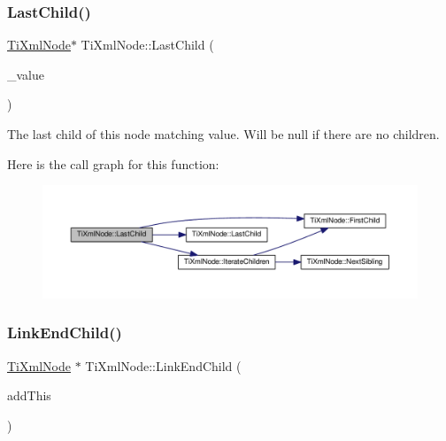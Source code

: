 \subsubsection{\texorpdfstring{Last\+Child()}{LastChild()}\hspace{0.1cm}{\footnotesize\ttfamily [4/4]}}
{\footnotesize\ttfamily \hyperlink{class_ti_xml_node}{Ti\+Xml\+Node}$\ast$ Ti\+Xml\+Node\+::\+Last\+Child (\begin{DoxyParamCaption}\item[{const char $\ast$}]{\+\_\+value }\end{DoxyParamCaption})\hspace{0.3cm}{\ttfamily [inline]}}



The last child of this node matching \textquotesingle{}value\textquotesingle{}. Will be null if there are no children. 

Here is the call graph for this function\+:\nopagebreak
\begin{figure}[H]
\begin{center}
\leavevmode
\includegraphics[width=350pt]{class_ti_xml_node_abad5bf1059c48127b958711ef89e8e5d_cgraph}
\end{center}
\end{figure}
\mbox{\label{class_ti_xml_node_a1a881212554b759865f6cac79a851d38}} 
\subsubsection{\texorpdfstring{Link\+End\+Child()}{LinkEndChild()}}
{\footnotesize\ttfamily \hyperlink{class_ti_xml_node}{Ti\+Xml\+Node} $\ast$ Ti\+Xml\+Node\+::\+Link\+End\+Child (\begin{DoxyParamCaption}\item[{\hyperlink{class_ti_xml_node}{Ti\+Xml\+Node} $\ast$}]{add\+This }\end{DoxyParamCaption})}

